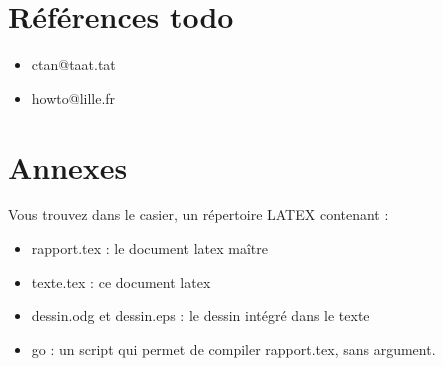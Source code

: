 \section{Références todo }
\begin{itemize}
\item ctan@taat.tat
\item howto@lille.fr
\end{itemize}

\section{Annexes }
Vous trouvez dans le casier, un répertoire LATEX contenant :
\begin{itemize}
\item rapport.tex : le document latex maître
\item texte.tex : ce document latex
\item dessin.odg et dessin.eps : le dessin intégré dans le texte
\item go : un script qui permet de compiler rapport.tex, sans argument.
\end{itemize}
